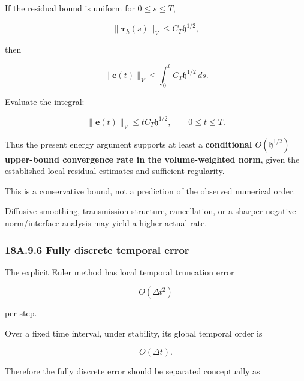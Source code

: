\documentclass[11pt,a4paper]{article}
\begin{document}
If the residual bound is uniform for $0\le s\le T$,

\begin{equation}
\|\boldsymbol\tau_h(s)\|_V
\le
C_T\mathfrak h^{1/2},
\tag{TRISO-ACC-301}
\label{eq:triso-acc-301}
\end{equation}

then

\begin{equation}
\|\mathbf e(t)\|_V
\le
\int_0^t
C_T\mathfrak h^{1/2}\,ds.
\tag{TRISO-ACC-302}
\label{eq:triso-acc-302}
\end{equation}

Evaluate the integral:

\begin{equation}
\boxed{
\|\mathbf e(t)\|_V
\le
tC_T\mathfrak h^{1/2},
\qquad
0\le t\le T.
}
\tag{TRISO-ACC-303}
\label{eq:triso-acc-303}
\end{equation}

Thus the present energy argument supports at least a \textbf{conditional $O(\mathfrak h^{1/2})$ upper-bound convergence rate in the volume-weighted norm}, given the established local residual estimates and sufficient regularity.

This is a conservative bound, not a prediction of the observed numerical order.

Diffusive smoothing, transmission structure, cancellation, or a sharper negative-norm/interface analysis may yield a higher actual rate.

\subsubsection*{18A.9.6 Fully discrete temporal error}

The explicit Euler method has local temporal truncation error

\begin{equation}
O(\Delta t^2)
\tag{TRISO-ACC-304}
\label{eq:triso-acc-304}
\end{equation}

per step.

Over a fixed time interval, under stability, its global temporal order is

\begin{equation}
O(\Delta t).
\tag{TRISO-ACC-305}
\label{eq:triso-acc-305}
\end{equation}

Therefore the fully discrete error should be separated conceptually as
\end{document}
